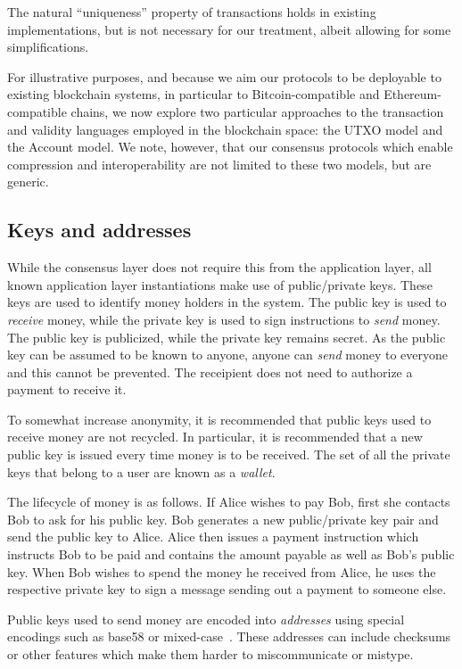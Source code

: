 The natural ``uniqueness'' property of transactions holds in existing
implementations, but is not necessary for our treatment, albeit allowing for
some simplifications.

For illustrative purposes, and because we aim our protocols to be deployable to
existing blockchain systems, in particular to Bitcoin-compatible and
Ethereum-compatible chains, we now explore two particular approaches to the
transaction and validity languages employed in the blockchain space: the UTXO
model and the Account model. We note, however, that our consensus protocols
which enable compression and interoperability are not limited to these two
models, but are generic.

\subsection{Keys and addresses}
While the consensus layer does not require this from the application layer,
all known application layer instantiations make use of public/private keys.
These keys are used to identify money holders in the system. The public key is
used to \emph{receive} money, while the private key is used to sign instructions
to \emph{send} money. The public key is publicized, while the private key
remains secret. As the public key can be assumed to be known to anyone, anyone
can \emph{send} money to everyone and this cannot be prevented. The receipient
does not need to authorize a payment to receive it.

To somewhat increase anonymity, it is recommended that public keys used to
receive money are not recycled. In particular, it is recommended that a new
public key is issued every time money is to be received. The set of all
the private keys that belong to a user are known as a
\emph{wallet}.

The lifecycle of money is as follows. If Alice wishes to pay Bob, first she
contacts Bob to ask for his public key. Bob generates a new public/private key
pair and send the public key to Alice. Alice then issues a payment instruction
which instructs Bob to be paid and contains the amount payable as well as Bob's
public key. When Bob wishes to spend the money he received from Alice, he uses
the respective private key to sign a message sending out a payment to someone
else.

Public keys used to send money are encoded into \emph{addresses}
using special encodings such as base58 or mixed-case~\cite{eip55}.
These addresses can include checksums or other features which make them harder
to miscommunicate or mistype.

